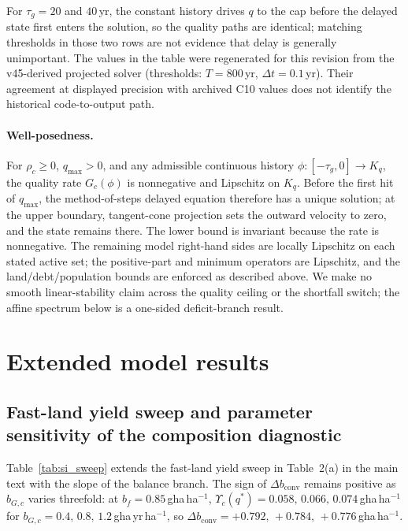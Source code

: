 \documentclass[11pt,a4paper]{article}
\newcommand{\dconv}{\Delta b_{\mathrm{conv}}}
\newcommand{\Ups}{\Upsilon_c}
\begin{document}
For $\tau_g=20$ and $40$\,yr, the constant history drives $q$ to the cap before the delayed state first enters the solution, so the quality paths are identical; matching thresholds in those two rows are not evidence that delay is generally unimportant. The values in the table were regenerated for this revision from the v45-derived projected solver (thresholds: $T=800$\,yr, $\Delta t=0.1$\,yr). Their agreement at displayed precision with archived C10 values does not identify the historical code-to-output path.

\paragraph{Well-posedness.} For $\rho_c\ge0$, $q_{\max}>0$, and any admissible continuous history $\phi:[-\tau_g,0]\to K_q$, the quality rate $G_c(\phi)$ is nonnegative and Lipschitz on $K_q$. Before the first hit of $q_{\max}$, the method-of-steps delayed equation therefore has a unique solution; at the upper boundary, tangent-cone projection sets the outward velocity to zero, and the state remains there. The lower bound is invariant because the rate is nonnegative. The remaining model right-hand sides are locally Lipschitz on each stated active set; the positive-part and minimum operators are Lipschitz, and the land/debt/population bounds are enforced as described above. We make no smooth linear-stability claim across the quality ceiling or the shortfall switch; the affine spectrum below is a one-sided deficit-branch result.

\section{Extended model results}\label{si:results}

\subsection{Fast-land yield sweep and parameter sensitivity of the composition diagnostic}\label{si:sweep}

Table~\ref{tab:si_sweep} extends the fast-land yield sweep in Table~2(a) in the main text with the slope of the balance branch. The sign of $\dconv$ remains positive as $b_{G,c}$ varies threefold: at $b_f=0.85$\,gha\,ha$^{-1}$, $\Ups(q^*)=0.058,\,0.066,\,0.074$\,gha\,ha$^{-1}$ for $b_{G,c}=0.4,\,0.8,\,1.2$\,gha\,yr\,ha$^{-1}$, so $\dconv=+0.792,\,+0.784,\,+0.776$\,gha\,ha$^{-1}$.
\end{document}

